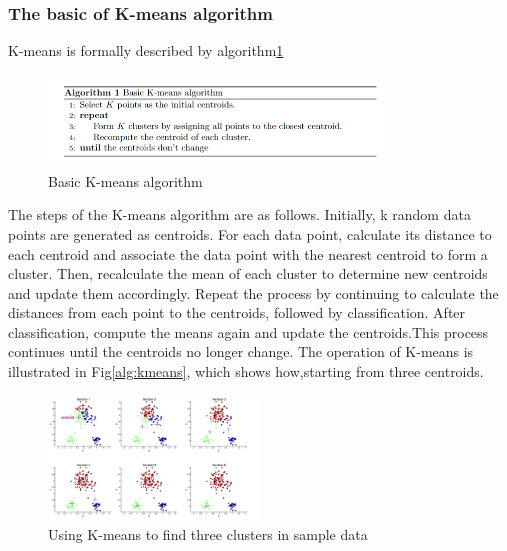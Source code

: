 \documentclass{article}
\begin{document}
\subsubsection{The basic of K-means algorithm}
K-means is formally described by algorithm\ref{fig:K-means-al}
\begin{figure}[hbt!]
    \centering
    \includegraphics[width=0.8\textwidth]{fig/zya/kal.png}
    \caption{Basic K-means algorithm}
    \label{fig:K-means-al}  %
\end{figure}
The steps of the K-means algorithm are as follows. Initially, k random data points are generated as centroids. For each data point, calculate its distance to each centroid and associate the data point with the nearest centroid to form a cluster. Then, recalculate the mean of each cluster to determine new centroids and update them accordingly. Repeat the process by continuing to calculate the distances from each point to the centroids, followed by classification. After classification, compute the means again and update the centroids.This process continues until the centroids no longer change.
The operation of K-means is illustrated in Fig\ref{alg:kmeans}, which shows how,starting from three centroids.
\begin{figure}[hbt!]
    \centering
    \includegraphics[width=0.5\textwidth]{fig/zya/k-means.png}
    \caption{Using K-means to find three clusters in sample data}
    \label{fig:kmeans}  %
\end{figure}
\end{document}
